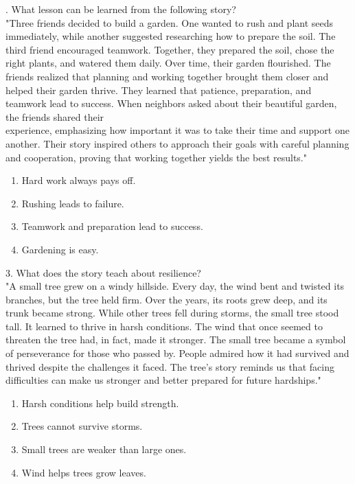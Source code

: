 \documentclass[12pt]{article}
\begin{document}
\vspace{1cm}
. What lesson can be learned from the following story?\\
"Three friends decided to build a garden. One wanted to rush and plant seeds \\immediately, while another suggested researching how to prepare the soil. The third friend encouraged teamwork. Together, they prepared the soil, chose the right plants, and watered them daily. Over time, their garden flourished. The friends realized that planning and working together brought them closer and helped their garden thrive. They learned that patience, preparation, and teamwork lead to success. When neighbors asked about their beautiful garden, the friends shared their \\experience, emphasizing how important it was to take their time and support one another. Their story inspired others to approach their goals with careful planning and cooperation, proving that working together yields the best results."\\
\begin{enumerate}[label=\Alph*.]
    \item Hard work always pays off.  
    \item Rushing leads to failure.  
    \item Teamwork and preparation lead to success.  
    \item Gardening is easy.  
\end{enumerate}

\vspace{1cm}

3. What does the story teach about resilience?\\
"A small tree grew on a windy hillside. Every day, the wind bent and twisted its branches, but the tree held firm. Over the years, its roots grew deep, and its trunk became strong. While other trees fell during storms, the small tree stood tall. It learned to thrive in harsh conditions. The wind that once seemed to threaten the tree had, in fact, made it stronger. The small tree became a symbol of perseverance for those who passed by. People admired how it had survived and thrived despite the challenges it faced. The tree’s story reminds us that facing difficulties can make us stronger and better prepared for future hardships."\\
\begin{enumerate}[label=\Alph*.]
    \item Harsh conditions help build strength.  
    \item Trees cannot survive storms.  
    \item Small trees are weaker than large ones.  
    \item Wind helps trees grow leaves.  
\end{enumerate}
\end{document}
